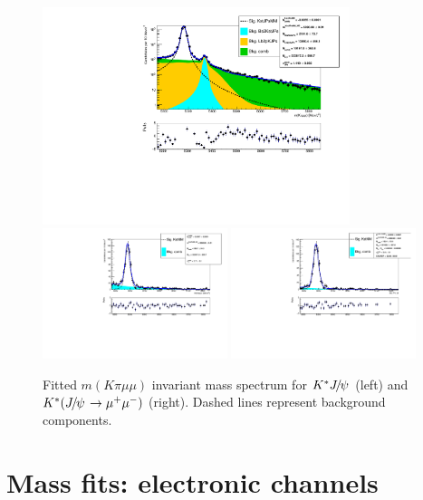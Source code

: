 \begin{figure}[h!]
\centering \includegraphics[width=0.8\textwidth]{RKst/figs/fit_MMs_0_MM-q2central-gmc/KstJPsMM_log_fitAndRes.pdf} \\
\includegraphics[width=0.48\textwidth]{RKst/figs/fit_MMs_0_MM-q2central-gmc/KstMM_fitAndRes.pdf}
\includegraphics[width=0.48\textwidth]{RKst/figs/fit_MMs_0_MM-q2high-gmc/KstMM_fitAndRes.pdf}
\caption{Fitted $m(K\pi \mu\mu)$ invariant mass spectrum for $\Kstar\jpsi$  (left) and $\Kstar(\jpsi\rightarrow \mumu)$ (right). Dashed lines represent background components. }
\label{fig:mumu_data_fits}
\end{figure}


\section{Mass fits: electronic channels}
\label{sec:RKst_fit_ee}

